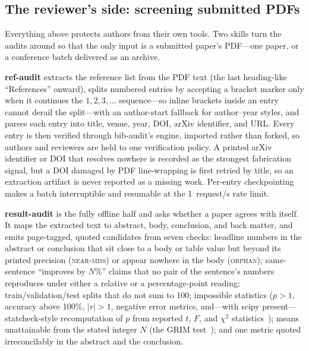 \documentclass[11pt]{article}
\begin{document}
\subsection{The reviewer's side: screening submitted PDFs}
\label{sec:review}

Everything above protects authors from their own tools. Two skills turn the
audits around so that the only input is a submitted paper's PDF---one paper,
or a conference batch delivered as an archive.

\textbf{ref-audit} extracts the reference list from the PDF text (the last
heading-like ``References'' onward), splits numbered entries by accepting a
bracket marker only when it continues the $1,2,3,\dots$ sequence---so inline
brackets inside an entry cannot derail the split---with an author-start
fallback for author--year styles, and parses each entry into title, venue,
year, DOI, arXiv identifier, and URL. Every entry is then verified through
bib-audit's engine, imported rather than forked, so authors and reviewers are
held to one verification policy. A printed arXiv identifier or DOI that
resolves nowhere is recorded as the strongest fabrication signal, but a DOI
damaged by PDF line-wrapping is first retried by title, so an extraction
artifact is never reported as a missing work. Per-entry checkpointing makes a
batch interruptible and resumable at the 1~request/s rate limit.

\textbf{result-audit} is the fully offline half and asks whether a paper
agrees with itself. It maps the extracted text to abstract, body, conclusion,
and back matter, and emits page-tagged, quoted candidates from seven checks:
headline numbers in the abstract or conclusion that sit close to a body or
table value but beyond its printed precision (\textsc{near-miss}) or appear
nowhere in the body (\textsc{orphan}); same-sentence ``improves by $N$\%''
claims that no pair of the sentence's numbers reproduces under either a
relative or a percentage-point reading; train/validation/test splits that do
not sum to 100; impossible statistics ($p>1$, accuracy above 100\%, $|r|>1$,
negative error metrics, and---with scipy present---statcheck-style
recomputation of $p$ from reported $t$, $F$, and $\chi^2$
statistics~\cite{nuijten2016statcheck}); means unattainable from the stated
integer $N$ (the GRIM test~\cite{brown2017grim}); and one metric quoted
irreconcilably in the abstract and the conclusion.
\end{document}
